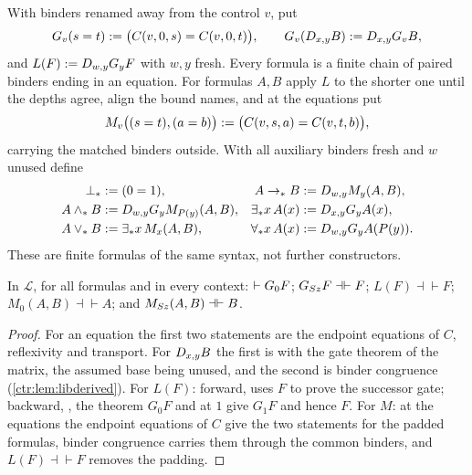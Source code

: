 \begin{definition}\label{ctr:def:macros}
With binders renamed away from the control $v$, put
\[
 G_v(s=t)\mathrel{:=}\bigl(C(v,0,s)=C(v,0,t)\bigr),\qquad G_v(D_{x,y}B)\mathrel{:=}D_{x,y}G_vB,
\]
and $L(F)\mathrel{:=}D_{w,y}G_yF$ with $w,y$ fresh. Every formula is a finite chain of paired
binders ending in an equation. For formulas $A,B$ apply $L$ to the shorter one until the
depths agree, align the bound names, and at the equations put
\[
 M_v\bigl((s=t),(a=b)\bigr)\mathrel{:=}\bigl(C(v,s,a)=C(v,t,b)\bigr),
\]
carrying the matched binders outside. With all auxiliary binders fresh and $w$ unused
define
\begin{equation}\label{ctr:eq:macros}
\begin{aligned}
 \bot_*&\mathrel{:=}(0=1), &
 A\to_*B&\mathrel{:=}D_{w,y}M_y(A,B),\\
 A\land_*B&\mathrel{:=}D_{w,y}G_yM_{P(y)}(A,B), &
 \exists_*x\,A(x)&\mathrel{:=}D_{x,y}G_yA(x),\\
 A\lor_*B&\mathrel{:=}\exists_*x\,M_x(A,B), &
 \forall_*x\,A(x)&\mathrel{:=}D_{w,y}G_yA(P(y)).
\end{aligned}
\end{equation}
These are finite formulas of the same syntax, not further constructors.
\end{definition}

\begin{lemma}\label{ctr:lem:gates}
In $\mathcal L$, for all formulas and in every context:
$\vdash G_0F$; $G_{S z}F\dashv\vdash F$; $L(F)\dashv\vdash F$;
$M_0(A,B)\dashv\vdash A$; and $M_{S z}(A,B)\dashv\vdash B$.
\end{lemma}
\begin{proof}
For an equation the first two statements are the endpoint equations of $C$, reflexivity and
transport. For $D_{x,y}B$ the first is  with the gate theorem of the matrix,
the assumed base being unused, and the second is binder congruence
(\cref{ctr:lem:libderived}). For $L(F)$: forward,  uses $F$ to prove the
successor gate; backward, , the theorem $G_0F$ and  at $1$ give
$G_1F$ and hence $F$. For $M$: at the equations the endpoint equations of $C$ give the two
statements for the padded formulas, binder congruence carries them through the common
binders, and $L(F)\dashv\vdash F$ removes the padding.
\end{proof}

